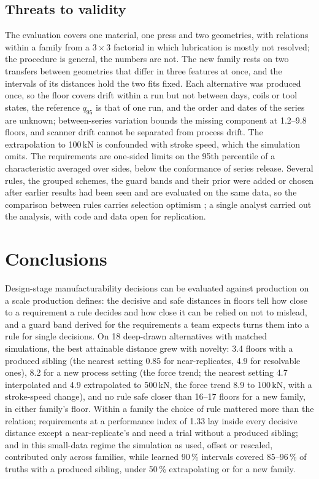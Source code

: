 \documentclass[pdflatex,sn-basic,lineno]{sn-jnl}
\begin{document}
\subsection{Threats to validity}

The evaluation covers one material, one press and two geometries, with relations within a family from a $3\times3$ factorial in which lubrication is mostly not resolved; the procedure is general, the numbers are not. The new family rests on two transfers between geometries that differ in three features at once, and the intervals of its distances hold the two fits fixed. Each alternative was produced once, so the floor covers drift within a run but not between days, coils or tool states, the reference $q_{95}$ is that of one run, and the order and dates of the series are unknown; between-series variation bounds the missing component at 1.2--9.8 floors, and scanner drift cannot be separated from process drift. The extrapolation to 100\,kN is confounded with stroke speed, which the simulation omits. The requirements are one-sided limits on the 95th percentile of a characteristic averaged over sides, below the conformance of series release. Several rules, the grouped schemes, the guard bands and their prior were added or chosen after earlier results had been seen and are evaluated on the same data, so the comparison between rules carries selection optimism \citep{cawley2010over}; a single analyst carried out the analysis, with code and data open for replication.

\section{Conclusions}\label{sec:conclusion}

Design-stage manufacturability decisions can be evaluated against production on a scale production defines: the decisive and safe distances in floors tell how close to a requirement a rule decides and how close it can be relied on not to mislead, and a guard band derived for the requirements a team expects turns them into a rule for single decisions. On 18 deep-drawn alternatives with matched simulations, the best attainable distance grew with novelty: 3.4 floors with a produced sibling (the nearest setting 0.85 for near-replicates, 4.9 for resolvable ones), 8.2 for a new process setting (the force trend; the nearest setting 4.7 interpolated and 4.9 extrapolated to 500\,kN, the force trend 8.9 to 100\,kN, with a stroke-speed change), and no rule safe closer than 16--17 floors for a new family, in either family's floor. Within a family the choice of rule mattered more than the relation; requirements at a performance index of 1.33 lay inside every decisive distance except a near-replicate's and need a trial without a produced sibling; and in this small-data regime the simulation as used, offset or rescaled, contributed only across families, while learned 90\,\% intervals covered 85--96\,\% of truths with a produced sibling, under 50\,\% extrapolating or for a new family.
\end{document}
